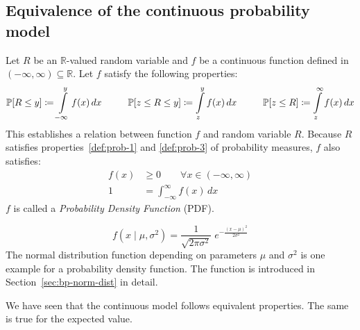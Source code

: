 \subsection{Equivalence of the continuous probability model}
\label{sec:bp-continuous}
%
\begin{definition}
  Let $R$ be an $\mathbb R$-valued random variable and
  $f$ be a continuous function defined in $(-\infty, \infty) \subseteq \mathbb R$.
  Let $f$ satisfy the following properties:
  \[
    \mathbb P[R \leq y] \coloneqq \int\limits_{-\infty}^y f(x) \, dx \hspace{28pt}
    \mathbb P[z \leq R \leq y] \coloneqq \int\limits_z^y f(x) \, dx \hspace{28pt}
    \mathbb P[z \leq R] \coloneqq \int\limits_z^\infty f(x) \, dx
  \]
  This establishes a relation between function $f$ and random variable $R$.
  Because $R$ satisfies properties~\ref{def:prob-1} and \ref{def:prob-3} of probability measures,
  $f$ also satisfies:
  \begin{align}
    f(x) &\geq 0 \qquad \forall x \in (-\infty, \infty) \label{prop:pdf1} \\
       1 &= \int_{-\infty}^{\infty} f(x) \, dx \label{prop:pdf2}
  \end{align}
  $f$ is called a \emph{Probability Density Function} (PDF).
\end{definition}
\begin{example}
  \[ f(x \; | \; \mu, \sigma^2) = \frac{1}{\sqrt{2\pi\sigma^2} } \; e^{ -\frac{(x-\mu)^2}{2\sigma^2} } \]
  The normal distribution function depending on parameters $\mu$ and $\sigma^2$ is one example for a probability density function.
  The function is introduced in Section~\ref{sec:bp-norm-dist} in detail.
\end{example}

We have seen that the continuous model follows equivalent properties.
The same is true for the expected value.

